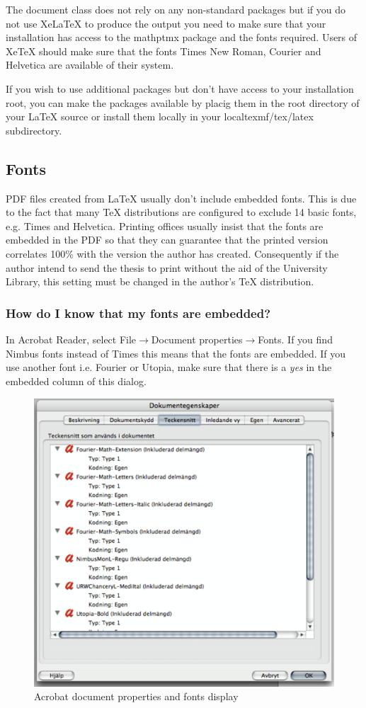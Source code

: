 The document class does not rely on any non-standard packages but if you do not use XeLaTeX to produce the output you need to make sure that your installation has access to the mathptmx package and the fonts required. Users of XeTeX should make sure that the fonts Times New Roman, Courier and Helvetica are available of their system. 

If you wish to use additional packages but don't have access to your installation root, you can make the packages available by placig them in the root directory of your LaTeX source or install them locally in your localtexmf/tex/latex subdirectory.
 
\subsection{Fonts}
PDF files created from LaTeX usually don't include embedded fonts. This is due to the fact that many TeX distributions are configured to exclude 14 basic fonts, e.g. Times and Helvetica. Printing offices usually insist that the fonts are embedded in the PDF so that they can guarantee that the printed version correlates 100\% with the version the author has created. Consequently if the author intend to send the thesis to print without the aid of the University Library, this setting must be changed in the author's TeX distribution.



\subsubsection{How do I know that my fonts are embedded?}
In Acrobat Reader, select File\(\rightarrow\)Document properties\(\rightarrow\)Fonts. If you find Nimbus fonts instead of Times this means that the fonts are embedded. If you use another font i.e. Fourier or Utopia, make sure that there is a \emph{yes} in the embedded column of this dialog.

    \begin{figure}[!ht]
    \includegraphics[width=12cm]{Example/Fonts}
	\caption{Acrobat document properties and fonts display} 
    \end{figure} 


